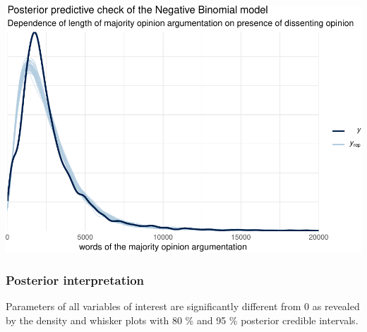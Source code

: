 \documentclass[
  11pt,
]{article}
\begin{document}
\includegraphics{dissents_article_files/figure-latex/pp_check_negbinom-1.pdf}

\hypertarget{posterior-interpretation}{%
\subsubsection{Posterior
interpretation}\label{posterior-interpretation}}

Parameters of all variables of interest are significantly different from
0 as revealed by the density and whisker plots with 80 \% and 95 \%
posterior credible intervals.
\end{document}
